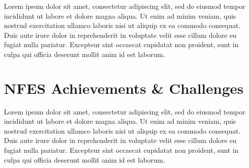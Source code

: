 \documentclass[5p,,preprint,12pt,twocolumn]{elsarticle}
\makeatletter
\def\fixFloatSize#1{}%
\makeatother
\begin{document}
\bgroup
\fixFloatSize{images/fbd73f28-2c70-4a0a-be0b-f58ca8eab694-uweightconcentrationplot.png}
\begin{figure}[!htbp]
\centering \makeatletter{}
\makeatother 
\caption{{}}
\label{f-ab38f7e015f7}
\end{figure}
\egroup
Lorem ipsum dolor sit amet, consectetur adipiscing elit, sed do eiusmod tempor incididunt ut labore et dolore magna aliqua. Ut enim ad minim veniam, quis nostrud exercitation ullamco laboris nisi ut aliquip ex ea commodo consequat. Duis aute irure dolor in reprehenderit in voluptate velit esse cillum dolore eu fugiat nulla pariatur. Excepteur sint occaecat cupidatat non proident, sunt in culpa qui officia deserunt mollit anim id est laborum.
    
\section{NFES Achievements \& Challenges}
Lorem ipsum dolor sit amet, consectetur adipiscing elit, sed do eiusmod tempor incididunt ut labore et dolore magna aliqua. Ut enim ad minim veniam, quis nostrud exercitation ullamco laboris nisi ut aliquip ex ea commodo consequat. Duis aute irure dolor in reprehenderit in voluptate velit esse cillum dolore eu fugiat nulla pariatur. Excepteur sint occaecat cupidatat non proident, sunt in culpa qui officia deserunt mollit anim id est laborum.
    






\end{document}
